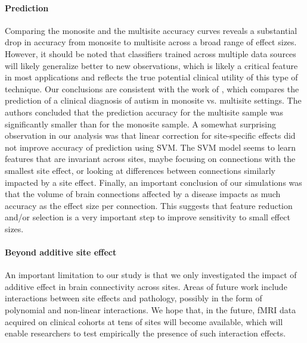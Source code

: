 \documentclass[authoryear]{elsarticle}
\begin{document}
\paragraph{Prediction}
Comparing the monosite and the multisite accuracy curves reveals a substantial
drop in accuracy from monosite to multisite across a broad range of effect
sizes. However, it should be noted that classifiers trained across multiple data
sources will likely generalize better to new observations, which is likely a
critical feature in most applications and reflects the true potential clinical
utility of this type of technique. Our conclusions are consistent with the work of
\cite{Nielsen2013}, which compares the prediction of a clinical diagnosis of
autism in monosite vs. multisite settings. The authors concluded that the
prediction accuracy for the multisite sample was significantly smaller than for
the monosite sample. A somewhat surprising observation in our analysis was that linear
correction for site-specific effects did not improve accuracy of prediction using
SVM. The SVM model seems to learn features that are invariant across sites,
maybe focusing on connections with the smallest site effect, or looking at
differences between connections similarly impacted by a site effect. Finally, an
important conclusion of our simulations was that the volume of brain connections
affected by a disease impacts as much accuracy as the effect size per
connection. This suggests that feature reduction and/or selection is a very
important step to improve sensitivity to small effect sizes.

\paragraph{Beyond additive site effect} An important limitation to our study is that we only investigated the impact of additive effect in brain connectivity across sites. Areas of future work include interactions between site effects and pathology, possibly in the form of polynomial and non-linear interactions. We hope that, in the future, fMRI data acquired on clinical cohorts at tens of sites will become available, which will enable researchers to test empirically the presence of such interaction effects. 
\end{document}
